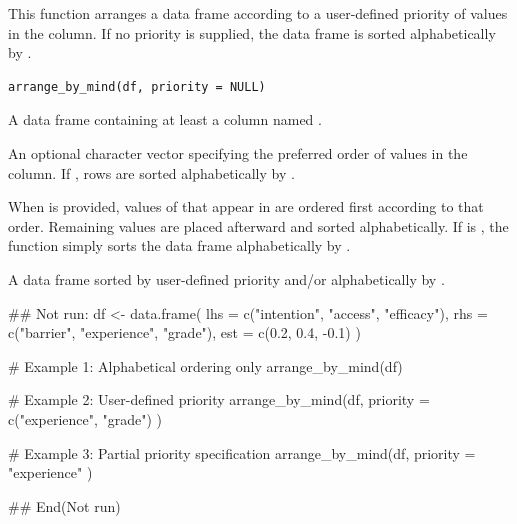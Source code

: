 \documentclass[a4paper]{book}
\begin{document}
%
\begin{Description}
This function arranges a data frame according to a user-defined
priority of values in the  column. If no priority is supplied,
the data frame is sorted alphabetically by .
\end{Description}
%
\begin{Usage}
\begin{verbatim}
arrange_by_mind(df, priority = NULL)
\end{verbatim}
\end{Usage}
%
\begin{Arguments}
\begin{ldescription}
\item[\code{df}] A data frame containing at least a column named .

\item[\code{priority}] An optional character vector specifying the preferred
order of values in the  column. If , rows are
sorted alphabetically by .
\end{ldescription}
\end{Arguments}
%
\begin{Details}
When  is provided, values of  that appear in
 are ordered first according to that order. Remaining
values are placed afterward and sorted alphabetically.
If  is , the function simply sorts the data
frame alphabetically by .
\end{Details}
%
\begin{Value}
A data frame sorted by user-defined priority and/or
alphabetically by .
\end{Value}
%
\begin{Examples}
\begin{ExampleCode}
\#\# Not run: 
df <- data.frame(
  lhs = c("intention", "access", "efficacy"),
  rhs = c("barrier", "experience", "grade"),
  est = c(0.2, 0.4, -0.1)
)

# Example 1: Alphabetical ordering only
arrange_by_mind(df)

# Example 2: User-defined priority
arrange_by_mind(df,
  priority = c("experience", "grade")
)

# Example 3: Partial priority specification
arrange_by_mind(df,
  priority = "experience"
)

## End(Not run)
\end{ExampleCode}
\end{Examples}
\end{document}
